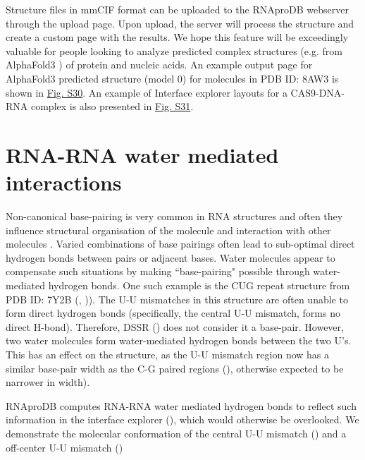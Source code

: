 Structure files in mmCIF format can be uploaded to the RNAproDB webserver through the upload page. Upon upload, the server will process the structure and create a custom page with the results. We hope this feature will be exceedingly valuable for people looking to analyze predicted complex structures (e.g. from AlphaFold3 \citep{Abramson2024}) of protein and nucleic acids. An example output page for AlphaFold3 predicted structure (model 0) for molecules in PDB ID: 8AW3 is shown in \hyperref[fig:rnaprodbS2]{Fig. S30}. An example of Interface explorer layouts for a CAS9-DNA-RNA complex  is also presented in \hyperref[fig:rnaprodbS3]{Fig. S31}.

\section{RNA-RNA water mediated interactions}

Non-canonical base-pairing is very common in RNA structures and often they influence structural organisation of the molecule and interaction with other molecules \citep{olson2019effects}. Varied combinations of base pairings often lead to sub-optimal direct hydrogen bonds between pairs or adjacent bases. Water molecules appear to compensate such situations by making ``base-pairing" possible through water-mediated hydrogen bonds. One such example is the CUG repeat structure from PDB ID: 7Y2B (\citep{wang2023structural}, )). The U-U mismatches in this structure are often unable to form direct hydrogen bonds (specifically, the central U-U mismatch, forms no direct H-bond). Therefore, DSSR (\citep{Lu2015}) does not consider it a base-pair. However, two water molecules form water-mediated hydrogen bonds between the two U's. This has an effect on the structure, as the U-U mismatch region now has a similar base-pair width as the C-G paired regions (), otherwise expected to be narrower in width). 

RNAproDB computes RNA-RNA water mediated hydrogen bonds to reflect such information in the interface explorer (), which would otherwise be overlooked. We demonstrate the molecular conformation of the central U-U mismatch () and a off-center U-U mismatch ()

